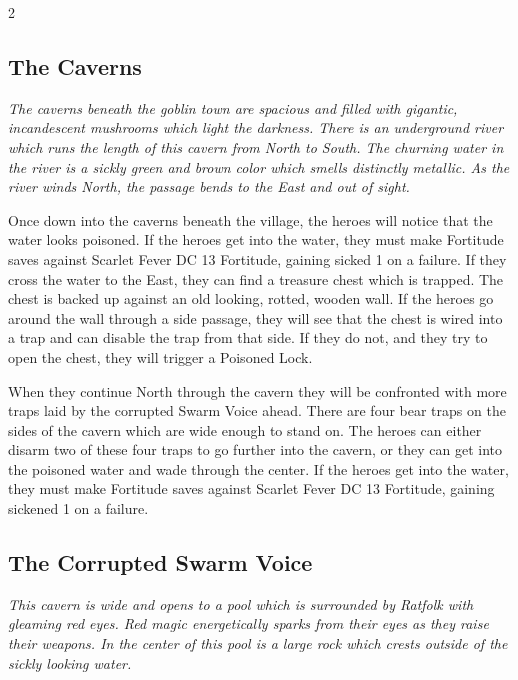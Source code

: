 \begin{multicols}{2}
  \subsection{The Caverns}

  \begin{pf-parchment}[\textcolor{title1}{Description}]
    \textcolor{title1}{\textit{The caverns beneath the goblin town are spacious and filled with gigantic, incandescent mushrooms which light the darkness. There is an underground river which runs the length of this cavern from North to South. The churning water in the river is a sickly green and brown color which smells distinctly metallic. As the river winds North, the passage bends to the East and out of sight.}}
  \end{pf-parchment}

  Once down into the caverns beneath the village, the heroes will notice that the water looks poisoned. If the heroes get into the water, they must make Fortitude saves against Scarlet Fever DC 13 Fortitude, gaining sicked 1 on a failure. If they cross the water to the East, they can find a treasure chest which is trapped. The chest is backed up against an old looking, rotted, wooden wall. If the heroes go around the wall through a side passage, they will see that the chest is wired into a trap and can disable the trap from that side. If they do not, and they try to open the chest, they will trigger a Poisoned Lock.

  When they continue North through the cavern they will be confronted with more traps laid by the corrupted Swarm Voice ahead. There are four bear traps on the sides of the cavern which are wide enough to stand on. The heroes can either disarm two of these four traps to go further into the cavern, or they can get into the poisoned water and wade through the center. If the heroes get into the water, they must make Fortitude saves against Scarlet Fever DC 13 Fortitude, gaining sickened 1 on a failure.

  \subsection{The Corrupted Swarm Voice}

  \begin{pf-parchment}[\textcolor{title1}{Description}]
    \textcolor{title1}{\textit{This cavern is wide and opens to a pool which is surrounded by Ratfolk with gleaming red eyes. Red magic energetically sparks from their eyes as they raise their weapons. In the center of this pool is a large rock which crests outside of the sickly looking water.}}
  \end{pf-parchment}


\end{multicols}
